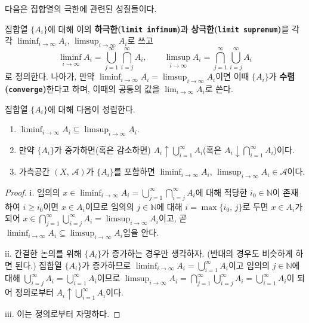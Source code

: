 다음은 집합열의 극한에 관련된 성질들이다.

\begin{definition}
    집합열 $\{A_i\}$에 대해 이의 \textbf{하극한(\texttt{limit infimum})}과 \textbf{상극한(\texttt{limit supremum})}을 각각 $\liminf_{i\to\infty}A_i,\,\limsup_{i\to\infty}A_i$로 쓰고
    \begin{equation*}
            \liminf_{i\to\infty}A_i=\bigcup_{j=1}^\infty\bigcap_{i=j}^\infty A_i,\qquad\limsup_{i\to\infty}A_i=\bigcap_{j=1}^\infty\bigcup_{i=j}^\infty A_i
      \end{equation*}
      로 정의한다. 나아가, 만약 $\liminf_{i\to\infty}A_i=\limsup_{i\to\infty}A_i$이면 이때 $\{A_i\}$가 \textbf{수렴(\texttt{converge})}한다고 하며, 이때의 공통의 값을 $\lim_{i\to\infty}A_i$로 쓴다.
\end{definition}

\begin{proposition}
    집합열 $\{A_i\}$에 대해 다음이 성립한다.
    \begin{enumerate}
        \item $\liminf_{i\to\infty}A_i\subseteq\limsup_{i\to\infty}A_i$.
        \item 만약 $\{A_i\}$가 증가하면(혹은 감소하면) $A_i\uparrow\bigcup_{i=1}^\infty A_i$(혹은 $A_i\downarrow\bigcap_{i=1}^\infty A_i$)이다.
        \item 가측공간 $(X,\,\mathcal{A})$가 $\{A_i\}$를 포함하면 $\liminf_{i\to\infty}A_i,\,\limsup_{i\to\infty}A_i\in\mathcal{A}$이다.
    \end{enumerate}
\end{proposition}

\begin{proof}
    i. 임의의 $x\in\liminf_{i\to\infty}A_i=\bigcup_{j=1}^\infty\bigcap_{i=j}^\infty A_i$에 대해 적당한 $i_0\in\mathbb{N}$이 존재하여 $i\geq i_0$이면 $x\in A_i$이므로 임의의 $j\in\mathbb{N}$에 대해 $i=\max\{i_0,\,j\}$로 두면 $x\in A_i$가 되어 $x\in\bigcap_{j=1}^\infty\bigcup_{i=j}^\infty A_i=\limsup_{i\to\infty}A_i$이고, 곧 $\liminf_{i\to\infty}A_i\subseteq\limsup_{i\to\infty}A_i$임을 안다.

    ii. 간결한 논의를 위해 $\{A_i\}$가 증가하는 경우만 생각하자. (반대의 경우도 비슷하게 하면 된다.) 집합열 $\{A_i\}$가 증가하므로 $\liminf_{i\to\infty}A_i=\bigcup_{i=1}^\infty A_i$이고 임의의 $j\in\mathbb{N}$에 대해 $\bigcup_{i=j}^\infty A_i=\bigcup_{i=1}^\infty A_i$이므로 $\limsup_{i\to\infty}A_i=\bigcap_{j=1}^\infty\bigcup_{i=j}^\infty A_i=\bigcup_{i=1}^\infty A_i$이 되어 정의로부터 $A_i\uparrow\bigcup_{i=1}^\infty A_i$이다.

    iii. 이는 정의로부터 자명하다.
\end{proof}

